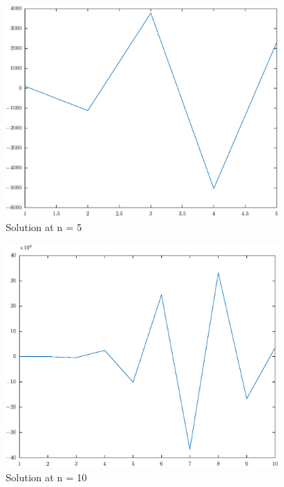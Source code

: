 \documentclass[11pt]{article}
\begin{document}
\begin{figure}[!hbt]
\begin{center}
	\includegraphics[width=4in]{math609_pa1_comp_example_3_n_5_.eps}
	\caption{Solution  at n = 5}
\end{center}
\end{figure}

\begin{figure}[!hbt]
\begin{center}
	\includegraphics[width=4in]{math609_pa1_comp_example_3_n_10_.eps}
	\caption{Solution  at n = 10}
\end{center}
\end{figure}
\end{document}
